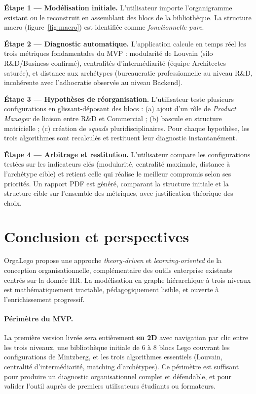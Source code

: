 \documentclass[11pt,a4paper]{article}
\begin{document}
\begin{infobox}
\textbf{Étape 1 --- Modélisation initiale.} L'utilisateur importe l'organigramme existant ou le reconstruit en assemblant des blocs de la bibliothèque. La structure macro (figure~\ref{fig:macro}) est identifiée comme \emph{fonctionnelle pure}.

\textbf{Étape 2 --- Diagnostic automatique.} L'application calcule en temps réel les trois métriques fondamentales du MVP : modularité de Louvain (silo R\&D/Business confirmé), centralités d'intermédiarité (équipe Architectes saturée), et distance aux archétypes (bureaucratie professionnelle au niveau R\&D, incohérente avec l'adhocratie observée au niveau Backend).

\textbf{Étape 3 --- Hypothèses de réorganisation.} L'utilisateur teste plusieurs configurations en glissant-déposant des blocs : (a) ajout d'un rôle de \emph{Product Manager} de liaison entre R\&D et Commercial ; (b) bascule en structure matricielle ; (c) création de \emph{squads} pluridisciplinaires. Pour chaque hypothèse, les trois algorithmes sont recalculés et restituent leur diagnostic instantanément.

\textbf{Étape 4 --- Arbitrage et restitution.} L'utilisateur compare les configurations testées sur les indicateurs clés (modularité, centralité maximale, distance à l'archétype cible) et retient celle qui réalise le meilleur compromis selon ses priorités. Un rapport PDF est généré, comparant la structure initiale et la structure cible sur l'ensemble des métriques, avec justification théorique des choix.
\end{infobox}

\section{Conclusion et perspectives}

OrgaLego propose une approche \emph{theory-driven} et \emph{learning-oriented} de la conception organisationnelle, complémentaire des outils enterprise existants centrés sur la donnée HR. La modélisation en graphe hiérarchique à trois niveaux est mathématiquement tractable, pédagogiquement lisible, et ouverte à l'enrichissement progressif.

\paragraph{Périmètre du MVP.} La première version livrée sera entièrement \textbf{en 2D} avec navigation par clic entre les trois niveaux, une bibliothèque initiale de 6 à 8 blocs Lego couvrant les configurations de Mintzberg, et les trois algorithmes essentiels (Louvain, centralité d'intermédiarité, matching d'archétypes). Ce périmètre est suffisant pour produire un diagnostic organisationnel complet et défendable, et pour valider l'outil auprès de premiers utilisateurs étudiants ou formateurs.
\end{document}
